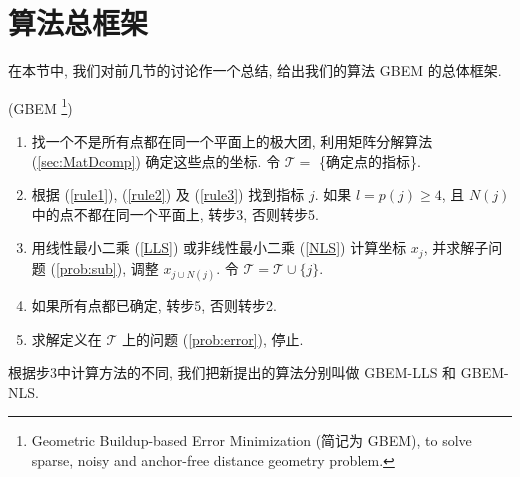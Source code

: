 \documentclass{CASthesis_zzk}
\begin{document}
\section{算法总框架}
\label{sec:framework}
在本节中, 我们对前几节的讨论作一个总结,
给出我们的算法 GBEM
的总体框架.
%
%

\begin{Alg} (GBEM \footnote{Geometric Buildup-based Error Minimization (简记为 GBEM), to solve sparse, noisy and anchor-free distance geometry problem.})
  \begin{adjustwidth}{1cm}{0cm}
    \begin{enumerate}[步1.]
      \item 找一个不是所有点都在同一个平面上的极大团, 利用矩阵分解算法 (\ref{sec:MatDcomp}) 确定这些点的坐标. 令 $\mathcal{T}=$ \{确定点的指标\}.
      \item 根据 (\ref{rule1}), (\ref{rule2}) 及 (\ref{rule3}) 找到指标 $j$. 如果 $l=p(j)\geq 4$, 且 $N(j)$ 中的点不都在同一个平面上, 转步3, 否则转步5.
      \item 用线性最小二乘 (\ref{LLS}) 或非线性最小二乘 (\ref{NLS}) 计算坐标 $x_j$, 并求解子问题 (\ref{prob:sub}), 调整 $x_{j\cup N(j)}$. 令 $\mathcal{T}=\mathcal{T}\cup \{j\}$.
      \item 如果所有点都已确定, 转步5, 否则转步2.
      \item 求解定义在 $\mathcal{T}$ 上的问题 (\ref{prob:error}), 停止.
    \end{enumerate}
  \end{adjustwidth}
  \label{alg:EGB}
\end{Alg}
根据步3中计算方法的不同, 我们把新提出的算法分别叫做
GBEM-LLS 和 GBEM-NLS.
\end{document}
